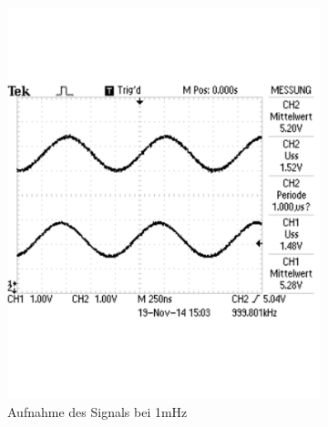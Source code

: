 \documentclass[12pt,a4paper]{article}
\begin{document}
\begin{figure}[H]
\begin{subfigure}[b]{0.28\textwidth}
                \includegraphics[width=\textwidth , scale = 0.4]{2_2_1m.pdf}
                \caption[Aufnahme des Signals bei 1mHz]{Aufnahme des Signals bei 1mHz}
                \label{fig:2_2_1m}
        \end{subfigure}
        \hfill
        \begin{subfigure}[b]{0.28\textwidth}

\end{subfigure}
\end{figure}
\end{document}
